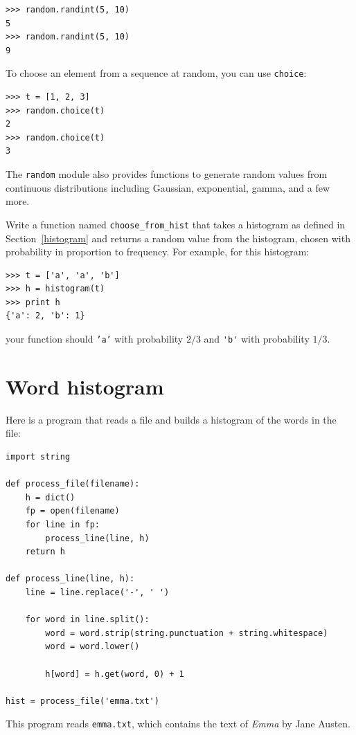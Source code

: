 
\beforeverb
\begin{verbatim}
>>> random.randint(5, 10)
5
>>> random.randint(5, 10)
9
\end{verbatim}
\afterverb
%
To choose an element from a sequence at random, you can use
{\tt choice}:


\beforeverb
\begin{verbatim}
>>> t = [1, 2, 3]
>>> random.choice(t)
2
>>> random.choice(t)
3
\end{verbatim}
\afterverb
%
The {\tt random} module also provides functions to generate
random values from continuous distributions including
Gaussian, exponential, gamma, and a few more.

\begin{ex}


Write a function named \verb"choose_from_hist" that takes
a histogram as defined in Section~\ref{histogram} and returns a 
random value from the histogram, chosen with probability
in proportion to frequency.  For example, for this histogram:

\beforeverb
\begin{verbatim}
>>> t = ['a', 'a', 'b']
>>> h = histogram(t)
>>> print h
{'a': 2, 'b': 1}
\end{verbatim}
\afterverb
%
your function should {\tt 'a'} with probability $2/3$ and \verb"'b'"
with probability $1/3$.
\end{ex}


\section{Word histogram}

Here is a program that reads a file and builds a histogram of the
words in the file:


\beforeverb
\begin{verbatim}
import string

def process_file(filename):
    h = dict()
    fp = open(filename)
    for line in fp:
        process_line(line, h)
    return h

def process_line(line, h):
    line = line.replace('-', ' ')
    
    for word in line.split():
        word = word.strip(string.punctuation + string.whitespace)
        word = word.lower()

        h[word] = h.get(word, 0) + 1

hist = process_file('emma.txt')
\end{verbatim}
\afterverb
%
This program reads {\tt emma.txt}, which contains the text of {\em
  Emma} by Jane Austen.

